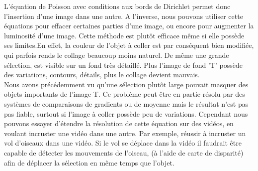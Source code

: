 L'équation de Poisson avec conditions aux bords de Dirichlet permet donc l'insertion d'une image dans une autre. A l'inverse, nous pouvons utiliser cette équations pour effacer certaines parties d'une image, ou encore pour augmenter la luminosité d'une image. Cette méthode est plutôt efficace même si elle possède ses limites.En effet, la couleur de l'objet à coller est par conséquent bien modifiée, qui parfois rends le collage beaucoup moins naturel. De même une grande sélection, est visible sur un fond très détaillé. Plus l'image de fond 'T' possède des variations, contours, détails, plus le collage devient mauvais. \\
Nous avons précédemment vu qu'une sélection plutôt large pouvait masquer des objets importants de l'image T. Ce problème peut être en partie résolu par des systèmes de comparaisons de gradients ou de moyenne mais le résultat n'est pas pas fiable, surtout si l'image à coller possède peu de variations. Cependant nous pouvons essayer d'étendre la résolution de cette équation sur des vidéos, en voulant incruster une vidéo dans une autre. Par exemple, réussir à incruster un vol d'oiseaux dans une vidéo. Si le vol se déplace dans la vidéo il faudrait être capable de détecter les mouvements de l'oiseau, (à l'aide de carte de disparité) afin de déplacer la sélection en même temps que l'objet.
\cite{Image}
\cite{Douglas}
\cite{Gradient}
\cite{Opti}
\cite{Fourier}